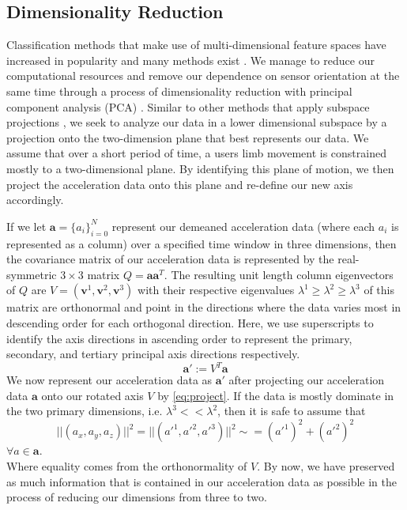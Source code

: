 \documentclass[conference]{IEEEtran}
\begin{document}
\subsection{Dimensionality Reduction} \label{sec:dim_red}
Classification methods that make use of multi-dimensional feature spaces have increased in popularity and many methods exist \cite{survey_multi_view_machine_learning}.
We manage to reduce our computational resources and remove our dependence on sensor orientation at the same time through a process of dimensionality reduction with principal component analysis (PCA) \cite{bishop_2006}.
Similar to other methods that apply subspace projections \cite{low_rank_subspace}, we seek to analyze our data in a lower dimensional subspace by a projection onto the two-dimension plane that best represents our data.
We assume that over a short period of time, a user\textquotesingle s limb movement is constrained mostly to a two-dimensional plane.
By identifying this plane of motion, we then project the acceleration data onto this plane and re-define our new axis accordingly.

If we let $\textbf{a} = \{a_i\}_{i=0}^{N}$ represent our demeaned acceleration data (where each $a_i$ is represented as a column) over a specified time window in three dimensions, then the covariance matrix of our acceleration data is represented by the real-symmetric $3 \times 3$ matrix $Q = \textbf{a} \textbf{a}^T$.
The resulting unit length column eigenvectors of $Q$ are $V = (\textbf{v}^1,\textbf{v}^2,\textbf{v}^3)$ with their respective eigenvalues $\lambda^1 \geq \lambda^2 \geq \lambda^3$ of this matrix are orthonormal and point in the directions where the data varies most in descending order for each orthogonal direction. Here, we use superscripts to identify the axis directions in ascending order to represent the primary, secondary, and tertiary principal axis directions respectively.
\begin{equation} \label{eq:project}
   \textbf{a}' := V^T \textbf{a}
\end{equation}
%
We now represent our acceleration data as $\textbf{a}'$ after projecting our acceleration data $\textbf{a}$ onto our rotated axis $V$ by \eqref{eq:project}. If the data is mostly dominate in the two primary dimensions, i.e. $\lambda^3 << \lambda^2$, then it is safe to assume that
%
\begin{equation} \label{eq:magnitude}
||(a_x,a_y,a_z)||^2 = ||(a'^1,a'^2,a'^3)||^2 \sim = (a'^1)^2 + (a'^2)^2
\end{equation}
$ \forall a \in \textbf{a}. $ \\
%
Where equality comes from the orthonormality of $V$.
By now, we have preserved as much information that is contained in our acceleration data as possible in the process of reducing our dimensions from three to two.
\end{document}
